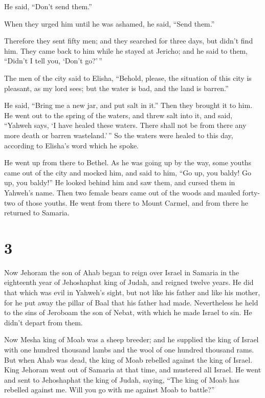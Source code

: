 He said, ``Don't send them.''

 When they urged him until he was ashamed, he said, ``Send
them.''

Therefore they sent fifty men; and they searched for three days, but
didn't find him.  They came back to him while he stayed at
Jericho; and he said to them, ``Didn't I tell you, `Don't go?'\,''

 The men of the city said to Elisha, ``Behold, please, the
situation of this city is pleasant, as my lord sees; but the water is
bad, and the land is barren.''

 He said, ``Bring me a new jar, and put salt in it.'' Then
they brought it to him.  He went out to the spring of the
waters, and threw salt into it, and said, ``Yahweh says, `I have healed
these waters. There shall not be from there any more death or barren
wasteland.'\,''  So the waters were healed to this day,
according to Elisha's word which he spoke.

 He went up from there to Bethel. As he was going up by the
way, some youths came out of the city and mocked him, and said to him,
``Go up, you baldy! Go up, you baldy!''  He looked behind
him and saw them, and cursed them in Yahweh's name. Then two female
bears came out of the woods and mauled forty-two of those youths.
 He went from there to Mount Carmel, and from there he
returned to Samaria.

\hypertarget{section-2}{%
\section{3}\label{section-2}}

 Now Jehoram the son of Ahab began to reign over Israel in
Samaria in the eighteenth year of Jehoshaphat king of Judah, and reigned
twelve years.  He did that which was evil in Yahweh's sight,
but not like his father and like his mother, for he put away the pillar
of Baal that his father had made.  Nevertheless he held to
the sins of Jeroboam the son of Nebat, with which he made Israel to sin.
He didn't depart from them.

 Now Mesha king of Moab was a sheep breeder; and he supplied
the king of Israel with one hundred thousand lambs and the wool of one
hundred thousand rams.  But when Ahab was dead, the king of
Moab rebelled against the king of Israel.  King Jehoram went
out of Samaria at that time, and mustered all Israel.  He
went and sent to Jehoshaphat the king of Judah, saying, ``The king of
Moab has rebelled against me. Will you go with me against Moab to
battle?''

